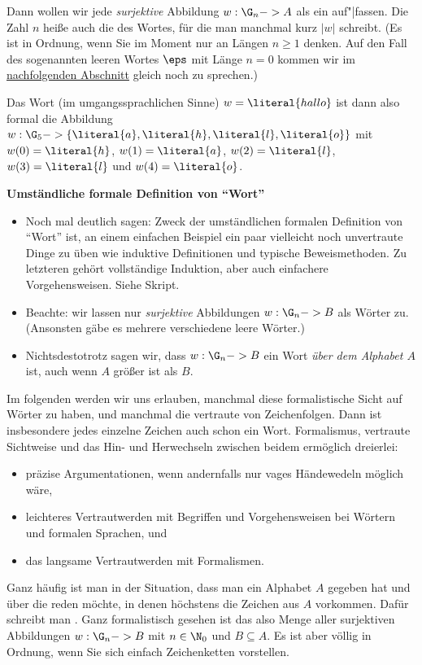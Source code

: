 Dann wollen wir jede \emph{surjektive} Abbildung $w:\G_n->A$ als ein
 auf"|fassen. Die Zahl
$n$ heiße auch die  des Wortes,
für die man manchmal kurz $|w|$ schreibt. (Es ist in Ordnung, wenn Sie
im Moment nur an Längen $n\geq 1$ denken. Auf den Fall des sogenannten
leeren Wortes $\eps$ mit Länge $n=0$ kommen wir im
\hyperref[sec:leeres-wort]{nachfolgenden Abschnitt} gleich
noch zu sprechen.)

Das Wort (im umgangssprachlichen Sinne) $w=\literal{hallo}$ ist dann
also formal die Abbildung $w:\G_5->\{\literal{a}, \literal{h},
\literal{l}, \literal{o}\}$ mit $w(0)=\literal{h}$,
$w(1)=\literal{a}$, $w(2)=\literal{l}$, $w(3)=\literal{l}$ und
$w(4)=\literal{o}$.
%
\begin{tutorium}
  \textbf{Umständliche formale Definition von "`Wort"'}

  \begin{itemize}
  \item Noch mal deutlich sagen: Zweck der umständlichen formalen
    Definition von "`Wort"' ist, an einem einfachen Beispiel ein paar
    vielleicht noch unvertraute Dinge zu üben wie induktive
    Definitionen und typische Beweismethoden.  Zu letzteren gehört
    vollständige Induktion, aber auch einfachere
    Vorgehensweisen. Siehe Skript.
  \item Beachte: wir lassen nur \emph{surjektive} Abbildungen
    $w:\G_n->B$ als Wörter zu. (Ansonsten gäbe es mehrere verschiedene
    leere Wörter.)
  \item Nichtsdestotrotz sagen wir, dass $w:\G_n->B$ ein Wort
    \emph{über dem Alphabet $A$} ist, auch wenn $A$ größer ist als $B$.
  \end{itemize}
\end{tutorium}

Im folgenden werden wir uns erlauben, manchmal diese formalistische
Sicht auf Wörter zu haben, und manchmal die vertraute von
Zeichenfolgen. Dann ist insbesondere jedes einzelne Zeichen auch schon
ein Wort. Formalismus, vertraute Sichtweise und das Hin- und
Herwechseln zwischen beidem ermöglich dreierlei:
%
\begin{itemize}
\item präzise Argumentationen, wenn andernfalls nur vages Händewedeln
  möglich wäre,
\item leichteres Vertrautwerden mit Begriffen und Vorgehensweisen bei
  Wörtern und formalen Sprachen, und
\item das langsame Vertrautwerden mit Formalismen.
\end{itemize}
%
Ganz häufig ist man in der Situation, dass man ein Alphabet $A$
gegeben hat und über die  reden möchte, in denen höchstens die Zeichen aus $A$
vorkommen. Dafür schreibt man
. Ganz formalistisch gesehen ist
das also Menge aller surjektiven Abbildungen $w:\G_n->B$ mit
$n\in\N_0$ und $B\subseteq A$. Es ist aber völlig in Ordnung, wenn Sie
sich einfach Zeichenketten vorstellen.


